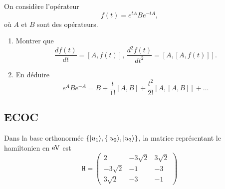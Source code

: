 \label{sec:IdOp1} On considère l'opérateur
\begin{equation}
f(t)=e^{tA}Be^{-tA},
\end{equation}
où $A$ et $B$ sont des opérateurs.

\begin{enumerate}
\item Montrer que%
\begin{equation}
\frac{df(t)}{dt}=[A,f(t)],\,\frac{d^2f(t)}{dt^2}=[A,[A,f(t)]].
\end{equation}

\item En déduire
\begin{equation}
e^{A}Be^{-A}=B+\frac{t}{1!}[A,B]+\frac{t^{2}}{2!}[A,[A,B]]+\ldots
\end{equation}

\end{enumerate}

\subsection{ECOC}
\label{ECOC}
Dans la base orthonormée $\{\vert u_1\rangle,\{\vert u_2\rangle,\vert u_3\rangle\}$, la matrice
représentant le hamiltonien en $\operatorname{eV}$ est%
\begin{equation}
\mathtt{H}=\begin{pmatrix}
2 & -3\sqrt{2} & 3\sqrt{2}\\
-3\sqrt{2} & -1 & -3\\
3\sqrt{2} & -3 & -1
\end{pmatrix}
\end{equation}

